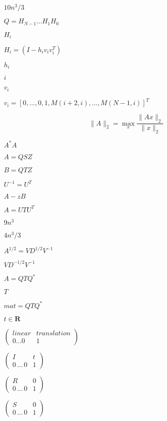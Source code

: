 \documentclass{article}
\begin{document}
$ 10n^3/3 $
\pagebreak

$ Q = H_{N-1} \ldots H_1 H_0 $
\pagebreak

$ H_i $
\pagebreak

$ H_i = (I - h_i v_i v_i^T) $
\pagebreak

$ h_i $
\pagebreak

$ i $
\pagebreak

$ v_i $
\pagebreak

$ v_i = [ 0, \ldots, 0, 1, M(i+2,i), \ldots, M(N-1,i) ]^T $
\pagebreak

\[ \|A\|_2 = \max_x \frac{\|Ax\|_2}{\|x\|_2} \]
\pagebreak

$ A^*A $
\pagebreak

$ A = Q S Z $
\pagebreak

$ B = Q T Z $
\pagebreak

$ U^{-1} = U^T $
\pagebreak

$ A - z B $
\pagebreak

$ A = U T U^T $
\pagebreak

$ 9n^3 $
\pagebreak

$ 4n^3/3 $
\pagebreak

$ A^{1/2} = V D^{1/2} V^{-1} $
\pagebreak

$ V D^{-1/2} V^{-1} $
\pagebreak

$ A = Q T Q^* $
\pagebreak

$ T $
\pagebreak

$ mat = Q T Q^* $
\pagebreak

$ t \in \mathbf{R} $
\pagebreak

$ \left( \begin{array}{cc} linear & translation\\ 0 ... 0 & 1 \end{array} \right) $
\pagebreak

$ \left( \begin{array}{cc} I & t \\ 0\,...\,0 & 1 \end{array} \right) $
\pagebreak

$ \left( \begin{array}{cc} R & 0\\ 0\,...\,0 & 1 \end{array} \right) $
\pagebreak

$ \left( \begin{array}{cc} S & 0\\ 0\,...\,0 & 1 \end{array} \right) $
\pagebreak
\end{document}
